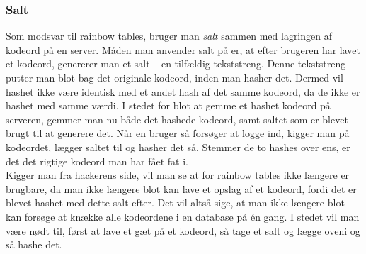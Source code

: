     \subsubsection{Salt}
    Som modsvar til rainbow tables, bruger man \emph{salt} sammen med lagringen af kodeord på en server. \cite{version2}
    Måden man anvender salt på er, at efter brugeren har lavet et kodeord, genererer man et salt -- en tilfældig tekststreng.
    Denne tekststreng putter man blot bag det originale kodeord, inden man hasher det.
    Dermed vil hashet ikke være identisk med et andet hash af det samme kodeord, da de ikke er hashet med samme værdi.
    I stedet for blot at gemme et hashet kodeord på serveren, gemmer man nu både det hashede kodeord, samt saltet som er blevet brugt til at generere det.
    Når en bruger så forsøger at logge ind, kigger man på kodeordet, lægger saltet til og hasher det så.
    Stemmer de to hashes over ens, er det det rigtige kodeord man har fået fat i.\\
    Kigger man fra hackerens side, vil man se at for rainbow tables ikke længere er brugbare, da man ikke længere blot kan lave et opslag af et kodeord, fordi det er blevet hashet med dette salt efter.
    Det vil altså sige, at man ikke længere blot kan forsøge at knække alle kodeordene i en database på én gang.
    I stedet vil man være nødt til, først at lave et gæt på et kodeord, så tage et salt og lægge oveni og så hashe det.

